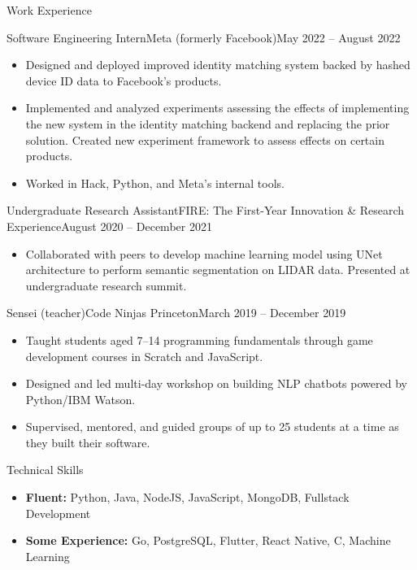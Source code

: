 \documentclass[]{mcdowellcv}
\begin{document}
	\begin{cvsection}{Work Experience}
		\begin{cvsubsection}{Software Engineering Intern}{Meta (formerly Facebook)}{May 2022 -- August 2022}
			\begin{itemize}
				\item Designed and deployed improved identity matching system backed by hashed device ID data to
				      Facebook's products.
				\item Implemented and analyzed experiments assessing the effects of implementing the new system in the
					  identity matching backend and replacing the prior solution. Created new experiment framework to
					  assess effects on certain products.
				\item Worked in Hack, Python, and Meta's internal tools.
			\end{itemize}
		\end{cvsubsection}
		\begin{cvsubsection}{Undergraduate Research Assistant}{FIRE: The First-Year Innovation \& Research Experience}{August 2020 -- December 2021}
			\vspace{0.8em}
			\begin{itemize}
				\item Collaborated with peers to develop machine learning model using UNet architecture to perform
				      semantic segmentation on LIDAR data. Presented at undergraduate research summit.
			\end{itemize}
		\end{cvsubsection}
		\begin{cvsubsection}{Sensei (teacher)}{Code Ninjas Princeton}{March 2019 -- December 2019}
			\begin{itemize}
				\item Taught students aged 7--14 programming fundamentals through
					  game development courses in Scratch and JavaScript.
				\item Designed and led multi-day workshop on building NLP chatbots
				      powered by Python/IBM Watson.
				\item Supervised, mentored, and guided groups of up to 25 students at a time as they 
				      built their software.
			\end{itemize}
		\end{cvsubsection}
	\end{cvsection}

	\begin{cvsection}{Technical Skills}
		\begin{cvsubsection}{}{}{}
			\vspace{0.5em}
			\begin{itemize}
				\item \textbf{Fluent:} Python, Java, NodeJS, JavaScript, MongoDB, Fullstack Development
				\item \textbf{Some Experience:} Go, PostgreSQL, Flutter, React Native, C, Machine Learning
			\end{itemize}		
		\end{cvsubsection}
	\end{cvsection}
\end{document}
